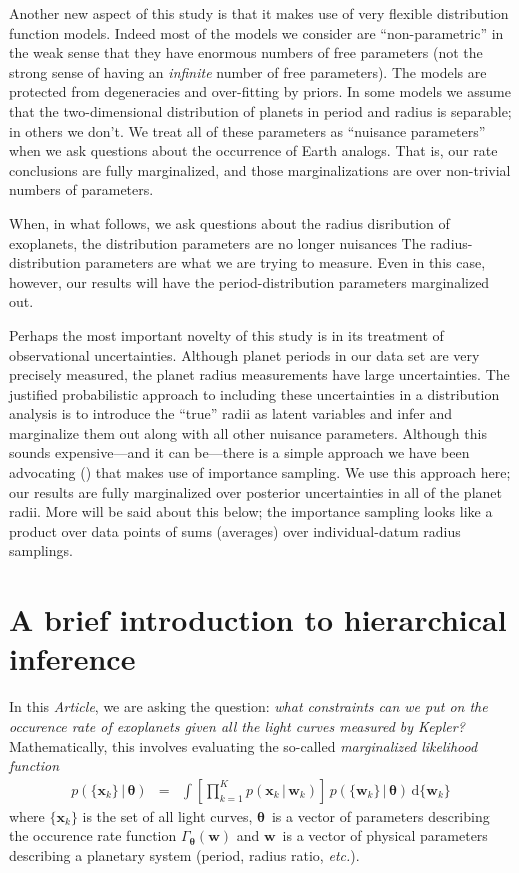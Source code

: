 \documentclass[12pt,preprint]{aastex}
\newcommand{\project}[1]{{\sffamily #1}}
\newcommand{\kepler}{\project{Kepler}}
\newcommand{\paper}{\emph{Article}}
\newcommand{\foreign}[1]{\emph{#1}}
\newcommand{\etc}{\foreign{etc.}}
\newcommand{\eqlabel}[1]{\label{eq:#1}}
\newcommand{\dd}{\ensuremath{\,\mathrm{d}}}
\newcommand{\bvec}[1]{\ensuremath{\boldsymbol{#1}}}
\newcommand{\rate}{\ensuremath{\Gamma}}
\newcommand{\ratepar}{{\ensuremath{\theta}}}
\newcommand{\ratepars}{{\ensuremath{\bvec{\ratepar}}}}
\newcommand{\data}{{\ensuremath{\bvec{x}}}}
\newcommand{\entry}{{\ensuremath{\bvec{w}}}}
\begin{document}
Another new aspect of this study is that it makes use of very flexible
distribution function models.
Indeed most of the models we consider are ``non-parametric'' in the weak sense
that they have enormous numbers of free parameters (not the strong sense of
having an \emph{infinite} number of free parameters).
The models are protected from degeneracies and over-fitting by priors.
In some models we assume that the two-dimensional distribution of planets in
period and radius is separable; in others we don't.
We treat all of these parameters as ``nuisance parameters'' when we ask
questions about the occurrence of Earth analogs.
That is, our rate conclusions are fully marginalized, and those
marginalizations are over non-trivial numbers of parameters.

When, in what follows, we ask questions about the radius disribution of
exoplanets, the distribution parameters are no longer nuisances The
radius-distribution parameters are what we are trying to measure.
Even in this case, however, our results will have the period-distribution
parameters marginalized out.

Perhaps the most important novelty of this study is in its treatment of
observational uncertainties.
Although planet periods in our data set are very precisely measured, the
planet radius measurements have large uncertainties.
The justified probabilistic approach to including these uncertainties in a
distribution analysis is to introduce the ``true'' radii as latent variables
and infer and marginalize them out along with all other nuisance parameters.
Although this sounds expensive---and it can be---there is a simple approach
we have been advocating (\cite{hogge}) that makes use of importance sampling.
We use this approach here; our results are fully marginalized over posterior
uncertainties in all of the planet radii.
More will be said about this below; the importance sampling looks like a
product over data points of sums (averages) over individual-datum radius
samplings.

\section{A brief introduction to hierarchical inference}

In this \paper, we are asking the question: \emph{what constraints can we put
on the occurence rate of exoplanets given all the light curves measured by
\kepler?}
Mathematically, this involves evaluating the so-called \emph{marginalized
likelihood function}
\begin{eqnarray}\eqlabel{crazylike}
p(\{\data_k\}\,|\,\ratepars) &=&
    \int\left[\prod_{k=1}^K p(\data_k\,|\,\entry_k)\right ]
    \,p(\{\entry_k\}\,|\,\ratepars)
    \dd\{\entry_k\}
\end{eqnarray}
where $\{\data_k\}$ is the set of all light curves, \ratepars\ is a vector of
parameters describing the occurence rate function $\rate_\ratepars(\entry)$
and \entry\ is a vector of physical parameters describing a planetary system
(period, radius ratio, \etc).
\end{document}
